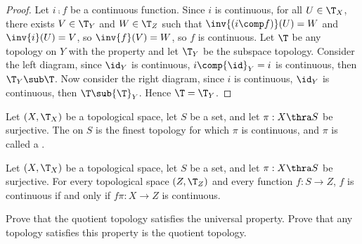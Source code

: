\documentclass[10pt]{article}
\begin{document}
\begin{center}
    \hspace{2.5cm}
\end{center}
\begin{proof}
    Let $i\comp f$ be a continuous function. Since $i$ is continuous, for all $U\in{\T}_{X}$, there exists $V\in{\T}_{Y}$ and $W\in{\T}_{Z}$ such that $\inv{(i\comp f)}(U)=W$ and $\inv{i}(U)=V$, so $\inv{f}(V)=W$, so $f$ is continuous. Let $\T$ be any topology on $Y$ with the property and let ${\T}_{Y}$ be the subspace topology. Consider the left diagram, since ${\id}_{Y}$ is continuous, $i\comp{\id}_{Y}=i$ is continuous, then ${\T}_{Y}\sub\T$. Now consider the right diagram, since $i$ is continuous, ${\id}_{Y}$ is continuous, then $\T\sub{\T}_{Y}$. Hence $\T={\T}_{Y}$.
\end{proof}
\begin{definition}
    Let $(X,{\T}_{X})$ be a topological space, let $S$ be a set, and let $\pi:X\thra S$ be surjective. The  on $S$ is the finest topology for which $\pi$ is continuous, and $\pi$ is called a .
\end{definition}
\begin{Universal property for quotient topology}
    Let $(X,{\T}_{X})$ be a topological space, let $S$ be a set, and let $\pi:X\thra S$ be surjective. For every topological space $(Z,{\T}_{Z})$ and every function $f:S\to Z$, $f$ is continuous if and only if $f\pi:X\to Z$ is continuous.
\end{Universal property for quotient topology}
\begin{center}
\end{center}
\begin{problem}
    Prove that the quotient topology satisfies the universal property. Prove that any topology satisfies this property is the quotient topology.
\end{problem}
\end{document}
